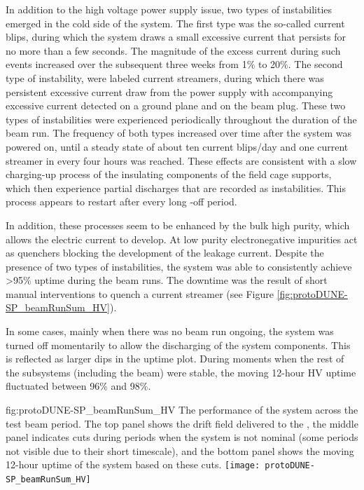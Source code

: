 In addition to the high voltage power supply issue, two types of instabilities emerged in the cold side of the  system. The first type was the so-called current blips, during which the system draws a small excessive current that persists for no more than a few seconds. The magnitude of the excess current during such events increased over the subsequent three weeks from 1\% to 20\%. The second type of instability, were labeled current streamers, during which there was persistent excessive current draw from the  power supply with accompanying excessive current detected on a ground plane and on the beam plug. These two types of instabilities were experienced periodically throughout the duration of the  beam run. The frequency of both types increased over time after the system was powered on, until a steady state of about ten current blips/day and one current streamer in every four hours was reached. These effects are consistent with a slow charging-up process of the insulating components of the field cage supports, which then experience partial discharges that are recorded as  instabilities. This process appears to restart after every long -off period. 

In addition, these processes seem to be enhanced by the  bulk high purity, which allows the electric current to develop. At low purity electronegative impurities act as quenchers blocking the development of the leakage current. Despite the presence of two types of instabilities, the  system was able to consistently achieve >95\% uptime during the beam runs. The downtime was the result of short manual interventions to quench a current streamer (see Figure \ref{fig:protoDUNE-SP_beamRunSum_HV}).

In some cases, mainly when there was no beam run ongoing, the  system was turned off momentarily to allow the discharging of the  system components. This is reflected as larger dips in the uptime plot. During moments when the rest of the subsystems (including the beam) were stable, the moving 12-hour HV uptime fluctuated between 96\% and 98\%.



\begin{dunefigure}
{fig:protoDUNE-SP_beamRunSum_HV}
{The performance of the  system across the test beam period. The top panel shows the drift field delivered to the , the middle panel indicates  cuts during periods when the system is not nominal (some periods not visible due to their short timescale), and the bottom panel shows the moving 12-hour uptime of the  system based on these  cuts.}
\texttt{[image: protoDUNE-SP\_beamRunSum\_HV]}
\end{dunefigure}

